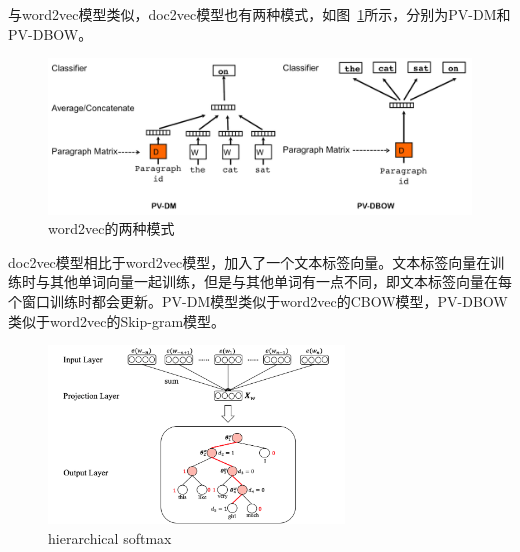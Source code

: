 与word2vec模型类似，doc2vec模型也有两种模式，如图~\ref{fig:doc2vec}所示，分别为PV-DM和PV-DBOW。\par

\begin{figure}[h]
  \centering
  \includegraphics[width=1\textwidth]{doc2vec.png}
  \caption{word2vec的两种模式}
  \label{fig:doc2vec}
\end{figure}

doc2vec模型相比于word2vec模型，加入了一个文本标签向量。文本标签向量在训练时与其他单词向量一起训练，但是与其他单词有一点不同，即文本标签向量在每个窗口训练时都会更新。PV-DM模型类似于word2vec的CBOW模型，PV-DBOW类似于word2vec的Skip-gram模型。\par


\begin{figure}[h]
  \centering
  \includegraphics[width=0.7\textwidth]{hierarchical_softmax.png}
  \caption{hierarchical softmax}
  \label{fig:hsoftmax}
\end{figure}

